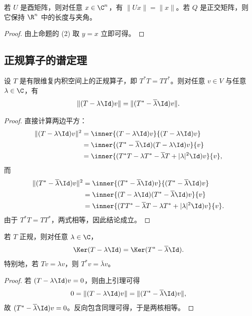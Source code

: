 \begin{corollary}
若 $U$ 是酉矩阵，则对任意 $x\in\C^n$，有 $\|Ux\|=\|x\|$。若 $Q$ 是正交矩阵，则它保持 $\R^n$ 中的长度与夹角。
\end{corollary}

\begin{proof}
由上命题的 (2) 取 $y=x$ 立即可得。
\end{proof}

\subsection{正规算子的谱定理}

\begin{lemma}
设 $T$ 是有限维复内积空间上的正规算子，即 $T^*T=TT^*$。则对任意 $v\in V$ 与任意 $\lambda\in\C$，有
\[
\|(T-\lambda\Id)v\|=\|(T^*-\overline{\lambda}\Id)v\|.
\]
\end{lemma}

\begin{proof}
直接计算两边平方：
\begin{align*}
\|(T-\lambda\Id)v\|^2
&=\inner{(T-\lambda\Id)v}{(T-\lambda\Id)v}\\
&=\inner{(T^*-\overline{\lambda}\Id)(T-\lambda\Id)v}{v}\\
&=\inner{(T^*T-\lambda T^*-\overline{\lambda}T+|\lambda|^2\Id)v}{v},
\end{align*}
而
\begin{align*}
\|(T^*-\overline{\lambda}\Id)v\|^2
&=\inner{(T^*-\overline{\lambda}\Id)v}{(T^*-\overline{\lambda}\Id)v}\\
&=\inner{(T-\lambda\Id)(T^*-\overline{\lambda}\Id)v}{v}\\
&=\inner{(TT^*-\overline{\lambda}T-\lambda T^*+|\lambda|^2\Id)v}{v}.
\end{align*}
由于 $T^*T=TT^*$，两式相等，因此结论成立。
\end{proof}

\begin{corollary}
若 $T$ 正规，则对任意 $\lambda\in\C$，
\[
\Ker(T-\lambda\Id)=\Ker(T^*-\overline{\lambda}\Id).
\]
特别地，若 $Tv=\lambda v$，则 $T^*v=\overline{\lambda}v$。
\end{corollary}

\begin{proof}
若 $(T-\lambda\Id)v=0$，则由上引理可得
\[
0=\|(T-\lambda\Id)v\|=\|(T^*-\overline{\lambda}\Id)v\|,
\]
故 $(T^*-\overline{\lambda}\Id)v=0$。反向包含同理可得，于是两核相等。
\end{proof}

